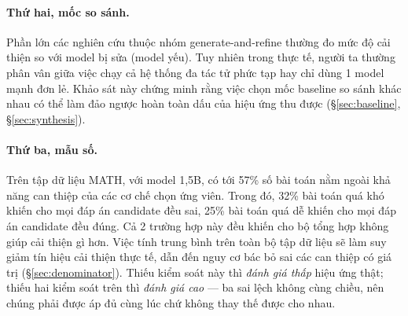 \documentclass[11pt,a4paper]{article}
\begin{document}
\paragraph{Thứ hai, mốc so sánh.} Phần lớn các nghiên cứu thuộc nhóm generate-and-refine thường đo mức độ cải thiện so với model bị sửa (model yếu). Tuy nhiên trong thực tế, người ta thường phân vân giữa việc chạy cả hệ thống đa tác tử phức tạp hay chỉ dùng 1 model mạnh đơn lẻ. Khảo sát này chứng minh rằng việc chọn mốc baseline so sánh khác nhau có thể làm đảo ngược hoàn toàn dấu của hiệu ứng thu được (\S\ref{sec:baseline},
\S\ref{sec:synthesis}).

\paragraph{Thứ ba, mẫu số.} Trên tập dữ liệu MATH, với model 1,5B, có tới 57\% số bài toán nằm ngoài khả năng can thiệp của các cơ chế chọn ứng viên. Trong đó, 32\% bài toán quá khó khiến cho mọi đáp án candidate đều sai, 25\% bài toán quá dễ khiến cho mọi đáp án candidate đều đúng. Cả 2 trường hợp này đều khiến cho bộ tổng hợp không giúp cải thiện gì hơn. Việc tính trung bình trên toàn bộ tập dữ liệu sẽ làm suy giảm tín hiệu cải thiện thực tế, dẫn đến nguy cơ bác bỏ sai các can thiệp có giá trị (\S\ref{sec:denominator}). Thiếu kiểm soát này thì \emph{đánh giá thấp} hiệu ứng thật; thiếu hai kiểm soát trên thì \emph{đánh giá cao} --- ba sai lệch không cùng chiều, nên chúng phải được áp đủ cùng lúc chứ không thay thế được cho nhau.
\end{document}
